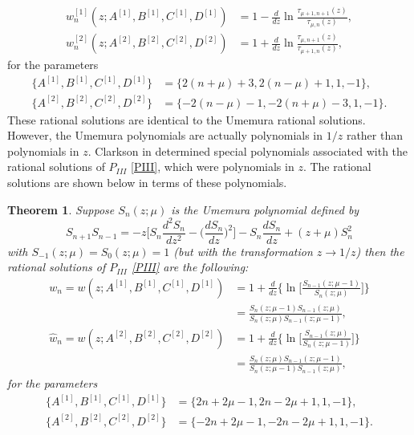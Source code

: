 \documentclass[12pt]{article}
\newtheorem{mydef}{Theorem}[section]
\numberwithin{figure}{section}
\numberwithin{equation}{section}
\numberwithin{table}{section}
\begin{document}
\begin{subequations}
\begin{align}
w^{[1]}_n(z;A^{[1]},B^{[1]},C^{[1]},D^{[1]})&=1-\frac{d}{dz}\ln\frac{\tau_{\mu+1,n+1}(z)}{\tau_{\mu,n}(z)},\\
w^{[2]}_n(z;A^{[2]},B^{[2]},C^{[2]},D^{[2]})&=1+\frac{d}{dz}\ln\frac{\tau_{\mu,n+1}(z)}{\tau_{\mu+1,n}(z)},
\end{align}
\end{subequations}
for the parameters
\begin{subequations}
\begin{align}
\{A^{[1]},B^{[1]},C^{[1]},D^{[1]}\}&=\{2(n+\mu)+3,2(n-\mu)+1,1,-1\},\\
\{A^{[2]},B^{[2]},C^{[2]},D^{[2]}\}&=\{-2(n-\mu)-1,-2(n+\mu)-3,1,-1\}.
\end{align}
\end{subequations}
These rational solutions are identical to the Umemura rational solutions. However, the Umemura polynomials are actually polynomials in $1/z$ rather than polynomials in $z$. Clarkson in \cite{P:36:9532} determined special polynomials associated with the rational solutions of $P_{III}$ \eqref{PIII}, which were polynomials in $z$. The rational solutions are shown below in terms of these polynomials.
\begin{mydef}
Suppose $S_n(z;\mu)$ is the Umemura polynomial defined by
$$S_{n+1}S_{n-1}=-z\bigg[S_n\frac{d^2S_n}{dz^2}-\bigg(\frac{dS_n}{dz}\bigg)^2\bigg]-S_n\frac{dS_n}{dz}+(z+\mu)S_n^2$$
with $S_{-1}(z;\mu)=S_0(z;\mu)=1$ \cite{P:36:9532}
(but with the transformation $z\rightarrow1/z$) then the rational solutions of $P_{III}$ \eqref{PIII} are the following:
\begin{subequations}
\begin{align}
w_n=w(z;A^{[1]},B^{[1]},C^{[1]},D^{[1]})&=1+\frac{d}{dz}\bigg\{\ln\bigg[\frac{S_{n-1}(z;\mu-1)}{S_n(z;\mu)}\bigg]\bigg\}\\
&=\frac{S_n(z;\mu-1)S_{n-1}(z;\mu)}{S_n(z;\mu)S_{n-1}(z;\mu-1)},\\
\hat w_n=w(z;A^{[2]},B^{[2]},C^{[2]},D^{[2]})&=1+\frac{d}{dz}\bigg\{\ln\bigg[\frac{S_{n-1}(z;\mu)}{S_n(z;\mu-1)}\bigg]\bigg\}\\
&=\frac{S_n(z;\mu)S_{n-1}(z;\mu-1)}{S_n(z;\mu-1)S_{n-1}(z;\mu)},
\end{align}
\end{subequations}
for the parameters
\begin{subequations}
\begin{align}
\{A^{[1]},B^{[1]},C^{[1]},D^{[1]}\}&=\{2n+2\mu-1,2n-2\mu+1,1,-1\},\\
\{A^{[2]},B^{[2]},C^{[2]},D^{[2]}\}&=\{-2n+2\mu-1,-2n-2\mu+1,1,-1\}.
\end{align}
\end{subequations}
\end{mydef}
\end{document}
